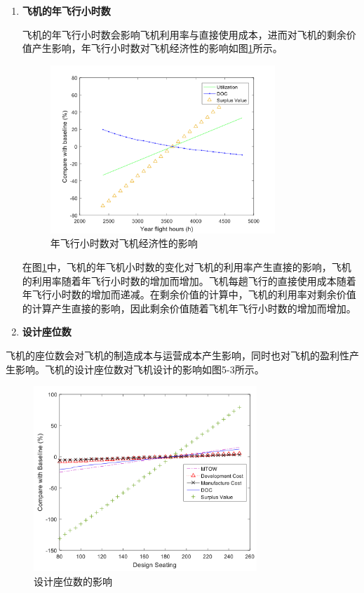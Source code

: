 \documentclass[12pt,a4paper]{report}
\begin{document}
\begin{enumerate}

\item \textbf{飞机的年飞行小时数}

飞机的年飞行小时数会影响飞机利用率与直接使用成本，进而对飞机的剩余价值产生影响，年飞行小时数对飞机经济性的影响如图\ref{fig:utilization}所示。

\begin{figure}[ht!]
	\centering
	\includegraphics[width=0.8\textwidth]{./media511/utilization.png}
	\caption{年飞行小时数对飞机经济性的影响}
	\label{fig:utilization}
\end{figure}

在图\ref{fig:utilization}中，飞机的年飞机小时数的变化对飞机的利用率产生直接的影响，飞机的利用率随着年飞行小时数的增加而增加。飞机每趟飞行的直接使用成本随着年飞行小时数的增加而递减。在剩余价值的计算中，飞机的利用率对剩余价值的计算产生直接的影响，因此剩余价值随着飞机年飞行小时数的增加而增加。

\item \textbf{设计座位数}
\end{enumerate}

飞机的座位数会对飞机的制造成本与运营成本产生影响，同时也对飞机的盈利性产生影响。飞机的设计座位数对飞机设计的影响如图5-3所示。

\begin{figure}[ht!]
	\centering
	\includegraphics[width=0.75\textwidth]{./media511/seats.png}
	\caption{设计座位数的影响}
	\label{fig:seats}
\end{figure}
\end{document}
